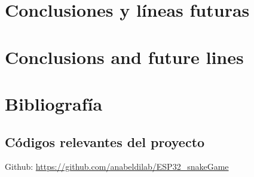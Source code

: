 \documentclass[spanish,a4paper,12pt,twoside,openright]{extreport}
\begin{document}



\newpage{\pagestyle{empty}}
\thispagestyle{empty}

\chapter{\LARGE Conclusiones y líneas futuras}
\label{chapter:Resultados}



\newpage{\pagestyle{empty}}
\thispagestyle{empty}

\chapter{\LARGE Conclusions and future lines}
\label{chapter:Conclusiones}



\newpage{\pagestyle{empty}}
\thispagestyle{empty}

\chapter{\LARGE Bibliografía}
\label{chapter:Bibliografía}






\newpage{\pagestyle{empty}\cleardoublepage}
\thispagestyle{empty}

\begin{appendix}


\chapter{\LARGE Códigos relevantes del proyecto}
\label{appendix:1}
Github: \url{https://github.com/anabeldilab/ESP32_snakeGame}


\end{appendix}
\end{document}
